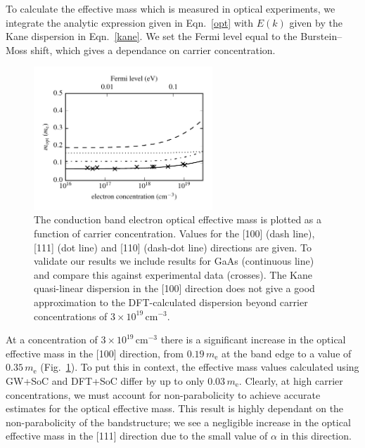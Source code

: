 To calculate the effective mass which is measured in optical experiments, we integrate the analytic expression given in Eqn.\ \ref{opt} with $E(k)$ given by the Kane dispersion in Eqn.\ \ref{kane}. 
We set the Fermi level equal to the Burstein--Moss shift, which gives a dependance on carrier concentration. 

\begin{figure}[tb] \centering
\includegraphics[width=0.6\textwidth]{./figures/ch4/optical_mass_concentration_MAPI.pdf}
\caption[Electron effective mass as a function of carrier concentration]{\label{optical_concentration_plot} The conduction band electron optical effective mass is plotted as a function of carrier concentration. Values for the [100] (dash line), [111] (dot line) and [110] (dash-dot line) directions are given. To validate our results we include results for GaAs (continuous line) and compare this against experimental data (crosses).\autocite{Raymond1979} The Kane quasi-linear dispersion in the [100] direction does not give a good approximation to the DFT-calculated dispersion beyond carrier concentrations of $3\!\times\!10^{19}\,\mathrm{cm}^{-3}$. }
\end{figure}

At a concentration of $3\!\times\!10^{19}\,\mathrm{cm}^{-3}$ there is a significant increase in the optical effective mass in the [100] direction, from $0.19\,m_\text{e}$ at the band edge to a value of $0.35\,m_\text{e}$ (Fig.\ \ref{optical_concentration_plot}). 
To put this in context, the effective mass values calculated using GW+SoC and DFT+SoC differ by up to only $0.03\,m_\text{e}$.\autocite{Umari2014}
Clearly, at high carrier concentrations, we must account for non-parabolicity to achieve accurate estimates for the optical effective mass.
This result is highly dependant on the non-parabolicity of the bandstructure; we see a negligible increase in the optical effective mass in the [111] direction due to the small value of $\alpha$ in this direction. 

